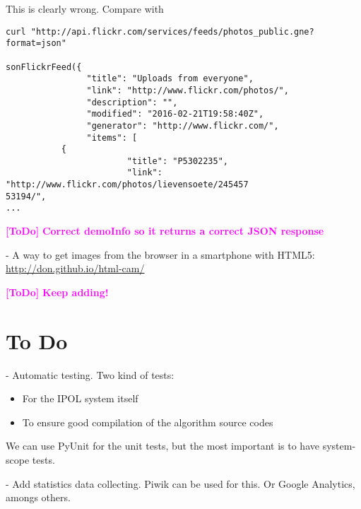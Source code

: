 \documentclass[a4paper,12pt]{article}
\newcommand{\ToDo}[1]{\textcolor{magenta}{\textbf{[ToDo]} \textbf{#1}}}
\begin{document}
This is clearly wrong. Compare with
\begin{verbatim}
curl "http://api.flickr.com/services/feeds/photos_public.gne?format=json"

sonFlickrFeed({
                "title": "Uploads from everyone",
                "link": "http://www.flickr.com/photos/",
                "description": "",
                "modified": "2016-02-21T19:58:40Z",
                "generator": "http://www.flickr.com/",
                "items": [
           {
                        "title": "P5302235",
                        "link": "http://www.flickr.com/photos/lievensoete/245457
53194/",
...
\end{verbatim}
\ToDo{Correct demoInfo so it returns a correct JSON response}

- A way to get images from the browser in a smartphone with HTML5: \url{http://don.github.io/html-cam/}

\ToDo{Keep adding!}


\section{To Do}
- Automatic testing. Two kind of tests:
\begin{itemize}
  \item For the IPOL system itself
  \item To ensure good compilation of the algorithm source codes
\end{itemize}

We can use PyUnit for the unit tests, but the most important is to have system-scope tests.

- Add statistics data collecting. Piwik can be used for this. Or Google Analytics, amongs others.




\end{document}
